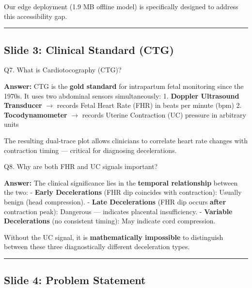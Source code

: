 \documentclass[11pt,a4paper]{article}
\begin{document}
Our edge deployment (1.9 MB offline model) is specifically designed to
address this accessibility gap.

\begin{center}\rule{0.5\linewidth}{0.5pt}\end{center}

\subsection{Slide 3: Clinical Standard
(CTG)}\label{slide-3-clinical-standard-ctg}

\begin{questionbox}
Q7. What is Cardiotocography (CTG)?
\end{questionbox}
\textbf{Answer:} CTG is the \textbf{gold standard} for intrapartum fetal
monitoring since the 1970s. It uses two abdominal sensors
simultaneously: 1. \textbf{Doppler Ultrasound Transducer} $\rightarrow$ records
Fetal Heart Rate (FHR) in beats per minute (bpm) 2.
\textbf{Tocodynamometer} $\rightarrow$ records Uterine Contraction (UC) pressure in
arbitrary units

The resulting dual-trace plot allows clinicians to correlate heart rate
changes with contraction timing --- critical for diagnosing
decelerations.

\begin{questionbox}
Q8. Why are both FHR and UC signals important?
\end{questionbox}
\textbf{Answer:} The clinical significance lies in the \textbf{temporal
relationship} between the two: - \textbf{Early Decelerations} (FHR dip
coincides with contraction): Usually benign (head compression). -
\textbf{Late Decelerations} (FHR dip occurs \textbf{after} contraction
peak): Dangerous --- indicates placental insufficiency. -
\textbf{Variable Decelerations} (no consistent timing): May indicate
cord compression.

Without the UC signal, it is \textbf{mathematically impossible} to
distinguish between these three diagnostically different deceleration
types.

\begin{center}\rule{0.5\linewidth}{0.5pt}\end{center}

\subsection{Slide 4: Problem Statement}\label{slide-4-problem-statement}
\end{document}
